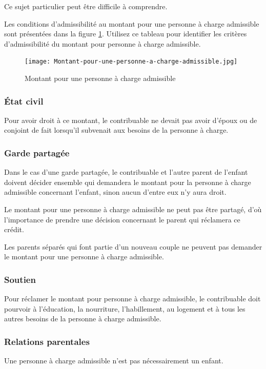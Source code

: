\begin{note}
	Ce sujet particulier peut être difficile à comprendre.
	
	Les conditions d'admissibilité au montant pour une personne à charge admissible sont présentées dans la figure \ref{fig:MontantPourUnePersonneAChargeAdmissible}. Utilisez ce tableau pour identifier les critères d'admissibilité du montant pour personne à charge admissible.
\end{note}

\begin{figure}
	\centering
	\texttt{[image: Montant-pour-une-personne-a-charge-admissible.jpg]}
	\caption{Montant pour une personne à charge admissible}
	\label{fig:MontantPourUnePersonneAChargeAdmissible}
\end{figure}

\subsubsection{État civil}
Pour avoir droit à ce montant, le contribuable ne devait pas avoir d'époux ou de conjoint de fait lorsqu'il subvenait aux besoins de la personne à charge.

\subsubsection{Garde partagée}
Dans le cas d'une garde partagée, le contribuable et l'autre parent de l'enfant doivent décider ensemble qui demandera le montant pour la personne à charge admissible concernant l'enfant, sinon aucun d'entre eux n'y aura droit.

Le montant pour une personne à charge admissible ne peut pas être partagé, d'où l'importance de prendre une décision concernant le parent qui réclamera ce crédit.

Les parents séparés qui font partie d'un nouveau couple ne peuvent pas demander le montant pour une personne à charge admissible.

\subsubsection{Soutien}
Pour réclamer le montant pour personne à charge admissible, le contribuable doit pourvoir à l'éducation, la nourriture, l'habillement, au logement et à tous les autres besoins de la personne à charge admissible.

\subsubsection{Relations parentales}
\begin{rappel}
	Une personne à charge admissible n'est pas nécessairement un enfant.
\end{rappel}

